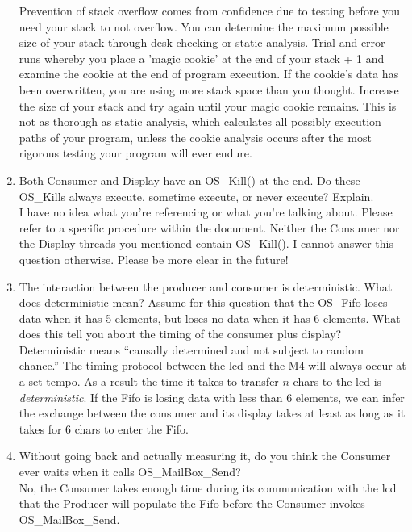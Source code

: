 \documentclass[12pt]{article}
\begin{document}
\begin{enumerate}[1)]
  Prevention of stack overflow comes from confidence due to testing
  before you need your stack to not overflow. You can determine the
  maximum possible size of your stack through desk checking or static
  analysis. Trial-and-error runs whereby you place a 'magic cookie' at
  the end of your stack + 1 and examine the cookie at the end of
  program execution. If the cookie's data has been overwritten, you
  are using more stack space than you thought. Increase the size of
  your stack and try again until your magic cookie remains. This is
  not as thorough as static analysis, which calculates all possibly
  execution paths of your program, unless the cookie analysis occurs
  after the most rigorous testing your program will ever endure.
\item Both Consumer and Display have an OS_Kill() at the end. Do these
  OS_Kills always execute, sometime execute, or never execute?
  Explain. \\
  I have no idea what you're referencing or what you're talking
  about. Please refer to a specific procedure within the
  document. Neither the Consumer nor the Display threads you mentioned
  contain OS_Kill(). I cannot answer this question otherwise. Please
  be more clear in the future!
\item The interaction between the producer and consumer is
  deterministic. What does deterministic mean? Assume for this
  question that the OS_Fifo loses data when it has 5 elements, but
  loses no data when it has 6 elements. What does this tell you about
  the timing of the consumer plus display? \\
  Deterministic means ``causally determined and not subject to random
  chance.'' The timing protocol between the lcd and the M4 will always
  occur at a set tempo. As a result the time it takes to transfer $n$
  chars to the lcd is \emph{deterministic}. If the Fifo is losing data
  with less than 6 elements, we can infer the exchange between the
  consumer and its display takes at least as long as it takes for 6
  chars to enter the Fifo.
\item Without going back and actually measuring it, do you think the
  Consumer ever waits when it calls OS_MailBox_Send? \\
  No, the Consumer takes enough time during its communication with the
  lcd that the Producer will populate the Fifo before the Consumer
  invokes OS_MailBox_Send.
\end{enumerate}
\end{document}
